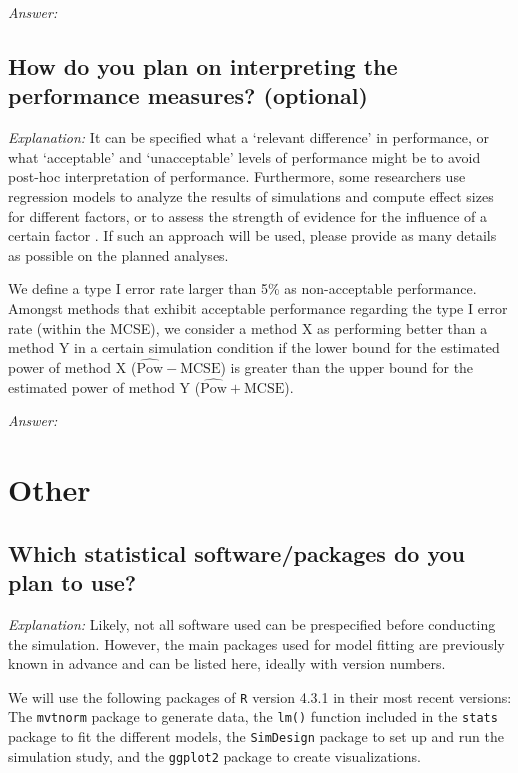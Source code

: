 \documentclass[12pt]{article}
\begin{document}
\textit{Answer:}

\subsection{How do you plan on interpreting the performance measures? \textmd{(optional)}}

\textit{Explanation:} It can be specified what a `relevant difference' in performance, or what `acceptable' and `unacceptable' levels of performance might be to avoid post-hoc interpretation of performance. Furthermore, some researchers use regression models to analyze the results of simulations and compute effect sizes for different factors, or to assess the strength of evidence for the influence of a certain factor \parencite{Skrondal2000, Chipman2022}. If such an approach will be used, please provide as many details as possible on the planned analyses.

\begin{examplebox}
We define a type I error rate larger than 5\% as non-acceptable performance. Amongst methods that exhibit acceptable performance regarding the type I error rate (within the MCSE), we consider a method X as performing better than a method Y in a certain simulation condition if the lower bound for the estimated power of method X ($\widehat{\text{Pow}}-\text{MCSE}$) is greater than the upper bound for the estimated power of method Y ($\widehat{\text{Pow}}+\text{MCSE}$).
\end{examplebox}

\textit{Answer:}

\section{Other}
\subsection{Which statistical software/packages do you plan to use?}

\textit{Explanation:} Likely, not all software used can be prespecified before conducting the simulation. However, the main packages used for model fitting are previously known in advance and can be listed here, ideally with version numbers.

\begin{examplebox}
We will use the following packages of \texttt{R} version 4.3.1 \parencite{R2020} in their most recent versions: The \texttt{mvtnorm} package \parencite{Genz2009} to generate data, the \texttt{lm()} function included in the \texttt{stats} package \parencite{R2020} to fit the different models, the \texttt{SimDesign} package \parencite{Chalmers2020} to set up  and run the simulation study, and the \texttt{ggplot2} package \parencite{Wickham2016} to create visualizations.
\end{examplebox}
\end{document}
